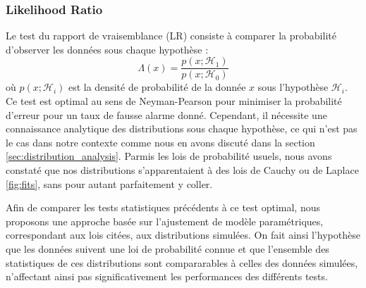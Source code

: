 \documentclass{article}
\begin{document}
\subsubsection{Likelihood Ratio}
Le test du rapport de vraisemblance (LR) consiste à comparer la probabilité d'observer les données sous chaque hypothèse :
\begin{equation}
    \Lambda(x) = \frac{p(x;\mathcal{H}_1)}{p(x;\mathcal{H}_0)}
\end{equation}
où $p(x;\mathcal{H}_i)$ est la densité de probabilité de la donnée $x$ sous l'hypothèse $\mathcal{H}_i$. Ce test est optimal au sens de Neyman-Pearson pour minimiser la probabilité d'erreur pour un taux de fausse alarme donné. Cependant, il nécessite une connaissance analytique des distributions sous chaque hypothèse, ce qui n'est pas le cas dans notre contexte comme nous en avons discuté dans la section \ref{sec:distribution_analysis}. Parmis les lois de probabilité usuels, nous avons constaté que nos distributions s'apparentaient à des lois de Cauchy ou de Laplace \ref{fig:fits}, sans pour autant parfaitement y coller.

 Afin de comparer les tests statistiques précédents à ce test optimal, nous proposons une approche basée sur l'ajustement de modèle paramétriques, correspondant aux lois citées, aux distributions simulées. On fait ainsi l'hypothèse que les données suivent une loi de probabilité connue et que l'ensemble des statistiques de ces distributions sont compararables à celles des données simulées, n'affectant ainsi pas significativement les performances des différents tests.
\end{document}
